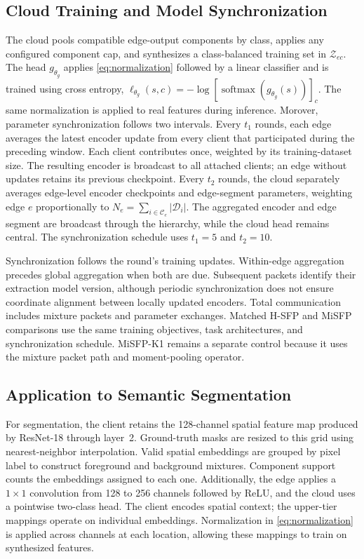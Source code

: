 \subsection{Cloud Training and Model Synchronization}
\label{subsec:training}

The cloud pools compatible edge-output components
by class, applies any configured component cap,
and synthesizes a class-balanced training set
in $\mathcal Z_{ec}$.
The head $g_{\theta_g}$ applies
\eqref{eq:normalization} followed by a linear classifier
and is trained using cross entropy,
$
\ell_{\theta_g}(s,c)
=
-\log[\operatorname{softmax}(g_{\theta_g}(s))]_c
$.
The same normalization is applied to real features
during inference.
Morover, parameter synchronization follows two intervals.
Every $t_1$ rounds, each edge averages the latest
encoder update from every client that participated
during the preceding window.
Each client contributes once, weighted by its
training-dataset size.
The resulting encoder is broadcast to all attached
clients; an edge without updates retains its
previous checkpoint.
Every $t_2$ rounds, the cloud separately averages
edge-level encoder checkpoints and edge-segment
parameters, weighting edge $e$ proportionally to
$N_e=\sum_{i\in\mathcal C_e}|\mathcal D_i|$.
The aggregated encoder and edge segment are broadcast
through the hierarchy, while the cloud head remains
central.
The synchronization schedule uses $t_1=5$
and $t_2=10$.

Synchronization follows the round's training updates.
Within-edge aggregation precedes global aggregation
when both are due.
Subsequent packets identify their extraction model version, although periodic synchronization does not ensure coordinate alignment between locally updated encoders.
Total communication includes mixture packets and
parameter exchanges.
Matched H-SFP and MiSFP comparisons use the same
training objectives, task architectures, and
synchronization schedule.
MiSFP-K1 remains a separate control because it uses
the mixture packet path and moment-pooling operator.

\subsection{Application to Semantic Segmentation}
\label{subsec:segmentation}

For segmentation, the client retains the 128-channel
spatial feature map produced by ResNet-18 through
layer~2.
Ground-truth masks are resized to this grid using
nearest-neighbor interpolation.
Valid spatial embeddings are grouped by pixel label to construct foreground and background mixtures.
Component support counts the embeddings assigned to each one. Additionally, the edge applies a $1\times1$ convolution from 128 to 256 channels followed by ReLU, and the cloud uses a pointwise two-class head.
The client encodes spatial context; the upper-tier
mappings operate on individual embeddings.
Normalization in \eqref{eq:normalization} is applied
across channels at each location, allowing these
mappings to train on synthesized
features.

